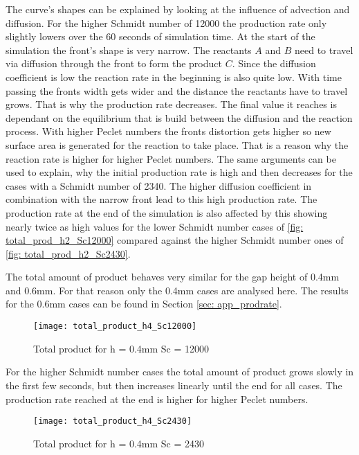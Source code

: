 \documentclass[../thesis.tex]{subfiles}
\begin{document}
The curve's shapes can be explained by looking at the influence of advection and diffusion. For the higher Schmidt number of 12000 the production rate only slightly lowers over the 60 seconds of simulation time. At the start of the simulation the front's shape is very narrow. The reactants $A$ and $B$ need to travel via diffusion through the front to form the product $C$. Since the diffusion coefficient is low the reaction rate in the beginning is also quite low. With time passing the fronts width gets wider and the distance the reactants have to travel grows. That is why the production rate decreases. The final value it reaches is dependant on the equilibrium that is build between the diffusion and the reaction process. With higher Peclet numbers the fronts distortion gets higher so new surface area is generated for the reaction to take place. That is a reason why the reaction rate is higher for higher Peclet numbers.
The same arguments can be used to explain, why the initial production rate is high and then decreases for the cases with a Schmidt number of 2340. The higher diffusion coefficient in combination with the narrow front lead to this high production rate. The production rate at the end of the simulation is also affected by this showing nearly twice as high values for the lower Schmidt number cases of \autoref{fig: total_prod_h2_Sc12000} compared against the higher Schmidt number ones of \autoref{fig: total_prod_h2_Sc2430}.
\newline

The total amount of product behaves very similar for the gap height of 0.4mm and 0.6mm. For that reason only the 0.4mm cases are analysed here. The results for the 0.6mm cases can be found in Section \ref{sec: app_prodrate}.
\begin{figure}[htb]
	\centering
	\texttt{[image: total\_product\_h4\_Sc12000]}
	\caption{Total product for  h = 0.4mm Sc = 12000}
	\label{fig: total_prod_h4_Sc12000}
\end{figure}
For the higher Schmidt number cases the total amount of product grows slowly in the first few seconds, but then increases linearly until the end for all cases. The production rate reached at the end is higher for higher Peclet numbers. 
\begin{figure}[htb]
	\centering
	\texttt{[image: total\_product\_h4\_Sc2430]}
	\caption{Total product for  h = 0.4mm Sc = 2430}
	\label{fig: total_prod_h4_Sc2430}
\end{figure}
\end{document}

